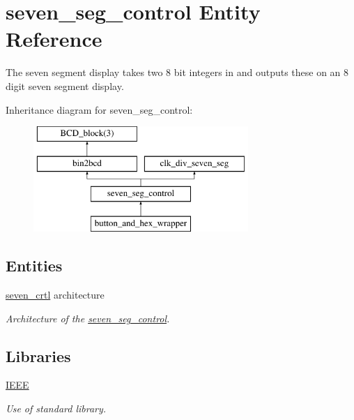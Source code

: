 \hypertarget{classseven__seg__control}{\section{seven\-\_\-seg\-\_\-control Entity Reference}
\label{classseven__seg__control}
}


The seven segment display takes two 8 bit integers in and outputs these on an 8 digit seven segment display.  


Inheritance diagram for seven\-\_\-seg\-\_\-control\-:\begin{figure}[H]
\begin{center}
\leavevmode
\includegraphics[height=4.000000cm]{classseven__seg__control}
\end{center}
\end{figure}
\subsection*{Entities}
\begin{DoxyCompactItemize}
\item 
\hyperlink{classseven__seg__control_1_1seven__crtl}{seven\-\_\-crtl} architecture
\begin{DoxyCompactList}\small\item\em Architecture of the \hyperlink{classseven__seg__control}{seven\-\_\-seg\-\_\-control}. \end{DoxyCompactList}\end{DoxyCompactItemize}
\subsection*{Libraries}
 \begin{DoxyCompactItemize}
\item 
\hypertarget{classseven__seg__control_ae4f03c286607f3181e16b9aa12d0c6d4}{\hyperlink{classseven__seg__control_ae4f03c286607f3181e16b9aa12d0c6d4}{I\-E\-E\-E} }\label{classseven__seg__control_ae4f03c286607f3181e16b9aa12d0c6d4}

\begin{DoxyCompactList}\small\item\em Use of standard library. \end{DoxyCompactList}\end{DoxyCompactItemize}
